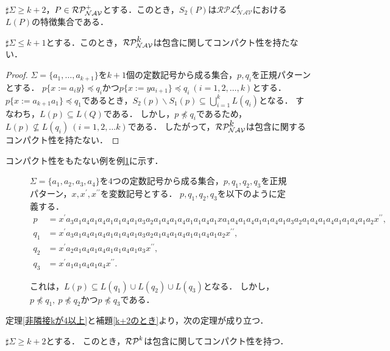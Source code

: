 \begin{col}
$\sharp\Sigma \ge k+2$，$P \in \mathcal{RP^{+}_{NAV}}$とする．このとき，$S_{2}(P)$は$\mathcal{RPL^{\mbox{$k$}}_{NAV}}$における$L(P)$の特徴集合である．
\end{col}

\begin{lem}\label{k+2のとき}
$\sharp\Sigma \le k+1$とする．このとき，$\mathcal{RP^{\mbox{$k$}}_{NAV}}$は包含に関してコンパクト性を持たない．
\end{lem}
\begin{proof}
$\Sigma = \{ a_{1}, \ldots , a_{k+1} \}$を$k+1$個の定数記号から成る集合，$p, q_{i}$を正規パターンとする．
$p \{ x := a_{i}y \} \preceq q_{i}$かつ$p \{ x := ya_{i+1} \} \preceq q_{i}~(i=1,2, \ldots ,k)$とする．
$p \{ x:= a_{k+1}a_{1} \} \preceq q_{1}$であるとき，$S_{2}(p) \backslash S_{1}(p) \subseteq \bigcup^{k}_{i=1} L(q_{i})$となる． 
すなわち，$L(p) \subseteq L(Q)$である．
しかし，$p \not \preceq q_{i}$であるため，$L(p) \not \subseteq L(q_{i})~(i=1,2, \ldots k)$である．
したがって，$\mathcal{RP^{\mbox{$k$}}_{NAV}}$は包含に関するコンパクト性を持たない．
\end{proof}

コンパクト性をもたない例を例\ref{反例k+1}に示す．
\begin{figure*}[tb]
\begin{ex}\label{反例k+1}
$\Sigma= \{a_{1}, a_{2}, a_{3}, a_{4} \}$を$4$つの定数記号から成る集合，$p,q_{1},q_{2},q_{3}$を正規パターン，$x,x^{\prime},x^{\prime\prime}$を変数記号とする．
$p,q_{1},q_{2},q_{3}$を以下のように定義する．
\begin{align*}
p & = x^{\prime}a_{3}a_{1}a_{4}a_{1}a_{4}a_{1}a_{1}a_{4}a_{1}a_{3}a_{2}a_{1}a_{4}a_{1}a_{4}a_{1}a_{1}a_{4}a_{1}xa_{1}a_{4}a_{1}a_{4}a_{1}a_{1}a_{4}a_{1}a_{3}a_{2}a_{1}a_{4}a_{1}a_{4}a_{1}a_{1}a_{4}a_{1}a_{2}x^{\prime\prime},\\
q_{1} & = x^{\prime}a_{3}a_{1}a_{4}a_{1}a_{4}a_{1}a_{1}a_{4}a_{1}a_{3}a_{2}a_{1}a_{4}a_{1}a_{4}a_{1}a_{1}a_{4}a_{1}a_{2}x^{\prime\prime},\\
q_{2} & = x^{\prime}a_{2}a_{1}a_{4}a_{1}a_{4}a_{1}a_{1}a_{4}a_{1}a_{3}x^{\prime\prime},\\
q_{3} & = x^{\prime}a_{1}a_{1}a_{4}a_{1}a_{4}x^{\prime\prime}.
\end{align*}

これは，$L(p) \subseteq L(q_{1}) \cup L(q_{2}) \cup L(q_{3})$となる．
しかし，$p \not \preceq q_{1},~p \not \preceq q_{2}$かつ$p \not \preceq q_{3}$である．
\end{ex}
\end{figure*}

定理\ref{非隣接kが4以上}と補題\ref{k+2のとき}より，次の定理が成り立つ．

\begin{thm}
$\sharp\Sigma \ge k+2$とする．
このとき，$\mathcal{RP}^{k}$は包含に関してコンパクト性を持つ．
\end{thm}